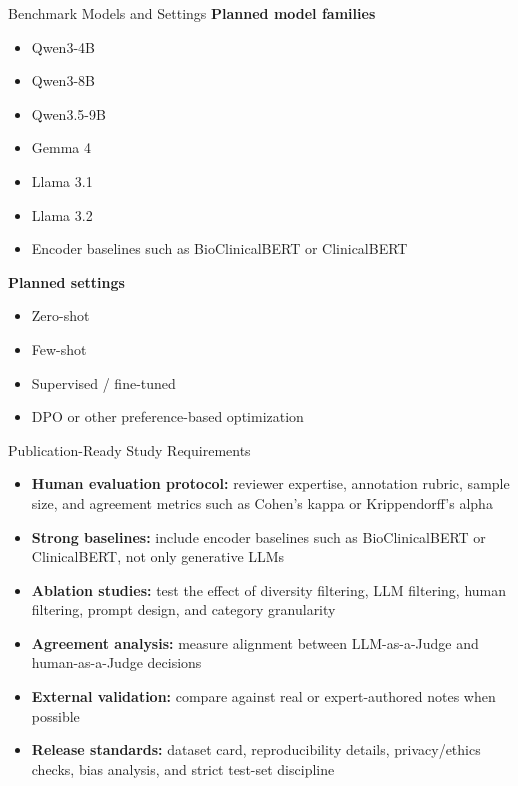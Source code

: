 \documentclass[aspectratio=169]{beamer}
\begin{document}
\begin{frame}{Benchmark Models and Settings}
    \small
    \textbf{Planned model families}
    \begin{itemize}
        \item Qwen3-4B
        \item Qwen3-8B
        \item Qwen3.5-9B
        \item Gemma 4
        \item Llama 3.1
        \item Llama 3.2
        \item Encoder baselines such as BioClinicalBERT or ClinicalBERT
    \end{itemize}

    \textbf{Planned settings}
    \begin{itemize}
        \item Zero-shot
        \item Few-shot
        \item Supervised / fine-tuned
        \item DPO or other preference-based optimization
    \end{itemize}
\end{frame}

\begin{frame}{Publication-Ready Study Requirements}
    \small
    \begin{itemize}
        \item \textbf{Human evaluation protocol:} reviewer expertise, annotation rubric, sample size, and agreement metrics such as Cohen's kappa or Krippendorff's alpha
        \item \textbf{Strong baselines:} include encoder baselines such as BioClinicalBERT or ClinicalBERT, not only generative LLMs
        \item \textbf{Ablation studies:} test the effect of diversity filtering, LLM filtering, human filtering, prompt design, and category granularity
        \item \textbf{Agreement analysis:} measure alignment between LLM-as-a-Judge and human-as-a-Judge decisions
        \item \textbf{External validation:} compare against real or expert-authored notes when possible
        \item \textbf{Release standards:} dataset card, reproducibility details, privacy/ethics checks, bias analysis, and strict test-set discipline
    \end{itemize}
\end{frame}
\end{document}
